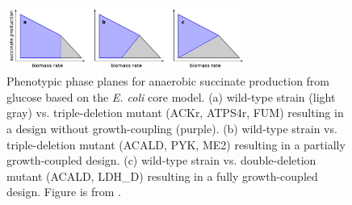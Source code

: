 \documentclass[10pt,a4paper]{article}
\begin{document}
\begin{figure}[ht!]
	\begin{center}
		\includegraphics[width=0.7\textwidth]{ppp}
		\caption{Phenotypic phase planes for anaerobic succinate production from glucose based on the \textit{E. coli} core model. (a) wild-type strain (light gray) vs. triple-deletion mutant (ACKr, ATPS4r, FUM) resulting in a design without growth-coupling (purple). (b) wild-type strain vs. triple-deletion mutant (ACALD, PYK, ME2) resulting in a partially growth-coupled design. (c) wild-type strain vs. double-deletion mutant (ACALD, LDH\_D) resulting in a fully growth-coupled design. Figure is from \textcite{machado_co-evolution_2015}.}\label{fig:ppp}
	\end{center}
\end{figure}
\end{document}
